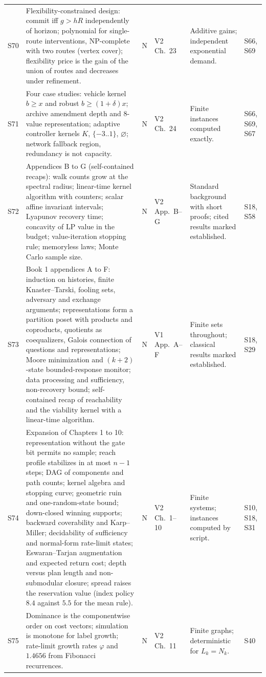 \documentclass[10pt]{article}
\begin{document}
\begin{longtable}{@{}l p{} c l p{} p{}@{}}
S70 & Flexibility-constrained design: commit iff $g>hR$ independently of horizon; polynomial for single-route interventions, NP-complete with two routes (vertex cover); flexibility price is the gain of the union of routes and decreases under refinement. & N & V2 Ch.~23 & Additive gains; independent exponential demand. & S66, S69\\[3pt]
S71 & Four case studies: vehicle kernel $b\ge x$ and robust $b\ge(1+\delta)x$; archive amendment depth and 8-value representation; adaptive controller kernels $K$, $\{-3..1\}$, $\varnothing$; network fallback region, redundancy is not capacity. & N & V2 Ch.~24 & Finite instances computed exactly. & S66, S69, S67\\[3pt]
S72 & Appendices B to G (self-contained recaps): walk counts grow at the spectral radius; linear-time kernel algorithm with counters; scalar affine invariant intervals; Lyapunov recovery time; concavity of LP value in the budget; value-iteration stopping rule; memoryless laws; Monte Carlo sample size. & N & V2 App.~B--G & Standard background with short proofs; cited results marked established. & S18, S58\\[3pt]
S73 & Book 1 appendices A to F: induction on histories, finite Knaster--Tarski, fooling sets, adversary and exchange arguments; representations form a partition poset with products and coproducts, quotients as coequalizers, Galois connection of questions and representations; Moore minimization and $(k+2)$-state bounded-response monitor; data processing and sufficiency, non-recovery bound; self-contained recap of reachability and the viability kernel with a linear-time algorithm. & N & V1 App.~A--F & Finite sets throughout; classical results marked established. & S18, S29\\[3pt]
S74 & Expansion of Chapters 1 to 10: representation without the gate bit permits no sample; reach profile stabilizes in at most $n-1$ steps; DAG of components and path counts; kernel algebra and stopping curve; geometric ruin and one-random-state bound; down-closed winning supports; backward coverability and Karp--Miller; decidability of sufficiency and normal-form rate-limit states; Eswaran--Tarjan augmentation and expected return cost; depth versus plan length and non-submodular closure; spread raises the reservation value (index policy $8.4$ against $5.5$ for the mean rule). & N & V2 Ch.~1--10 & Finite systems; instances computed by script. & S10, S18, S31\\[3pt]
S75 & Dominance is the componentwise order on cost vectors; simulation is monotone for label growth; rate-limit growth rates $\varphi$ and $1.4656$ from Fibonacci recurrences. & N & V2 Ch.~11 & Finite graphs; deterministic for $L_k=N_k$. & S40\\[3pt]

\end{longtable}
\end{document}
